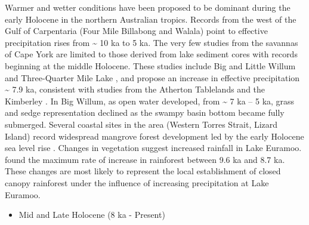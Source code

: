 \documentclass[
  12pt,
]{book}
\providecommand{\tightlist}{%
  \setlength{\itemsep}{0pt}\setlength{\parskip}{0pt}}
\begin{document}
Warmer and wetter conditions have been proposed to be dominant during the early Holocene in the northern Australian tropics. Records from the west of the Gulf of Carpentaria (Four Mile Billabong and Walala) point to effective precipitation rises from \textasciitilde{} 10 ka to 5 ka. The very few studies from the savannas of Cape York are limited to those derived from lake sediment cores with records beginning at the middle Holocene. These studies include Big and Little Willum \citep{proskeHoloceneDiatomRecords2017a, stevensonPalaeoenvironmentalHistoryBig2015} and Three-Quarter Mile Lake \citep{lulyHolocenePalaeoenvironmentsChange2006}, and propose an increase in effective precipitation \textasciitilde{} 7.9 ka, consistent with studies from the Atherton Tablelands and the Kimberley \citep{shulmeisterHolocenePollenRecord1992, haberle23000yrPollen2005, dennistonStalagmiteRecordHolocene2013, roweHoloceneSavannaDynamics2019}. In Big Willum, as open water developed, from \textasciitilde{} 7 ka -- 5 ka, grass and sedge representation declined as the swampy basin bottom became fully submerged. Several coastal sites in the area (Western Torres Strait, Lizard Island) record widespread mangrove forest development led by the early Holocene sea level rise \citep{rowePalynologicalInvestigationHolocene2007, proskeIslandEcosystemBiodiversity2012}. Changes in vegetation suggest increased rainfall in Lake Euramoo. \citet{haberle23000yrPollen2005} found the maximum rate of increase in rainforest between 9.6 ka and 8.7 ka. These changes are most likely to represent the local establishment of closed canopy rainforest under the influence of increasing precipitation at Lake Euramoo.

\begin{itemize}
\tightlist
\item
  Mid and Late Holocene (8 ka - Present)
\end{itemize}
\end{document}
